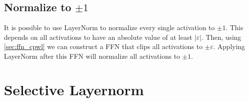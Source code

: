 \subsection{Normalize to $\pm1$}

It is possible to use LayerNorm to normalize every single activation to $\pm1$. This depends on all activations to have an absolute value of at least $|\varepsilon|$. Then, using \ref{sec:ffn_cpwl} we can construct a FFN that clips all activations to $\pm\varepsilon$. Applying LayerNorm after this FFN will normalize all activations to $\pm1$.

\section{Selective Layernorm}
\label{sec:ln_selective}


